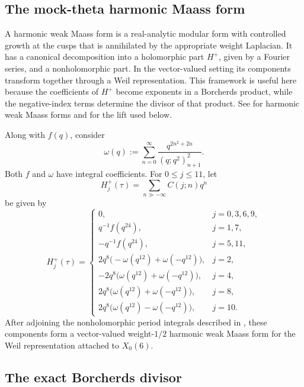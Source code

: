 \documentclass[11pt]{amsart}
\theoremstyle{remark}
\numberwithin{equation}{section}
\begin{document}
\subsection{The mock-theta harmonic Maass form}

A harmonic weak Maass form is a real-analytic modular form with controlled
growth at the cusps that is annihilated by the appropriate
weight Laplacian.  It has a canonical decomposition into a holomorphic part
$H^+$, given by a Fourier series, and a nonholomorphic part.  In the
vector-valued setting its components transform together through a Weil
representation.  This framework is useful here because the coefficients of
$H^+$ become exponents in a Borcherds product, while the negative-index
terms determine the divisor of that product.  See
\cite[Section~3]{BruinierFunke} for harmonic weak Maass forms and
\cite[Sections~6 and~8.2]{BruinierOnoAnnals} for the lift used below.

Along with $f(q)$, consider
\begin{equation}\label{eq:omega-mock}
 \omega(q):=\sum_{n=0}^{\infty}
 \frac{q^{2n^2+2n}}{(q;q^2)_{n+1}^2}.
\end{equation}
Both $f$ and $\omega$ have integral coefficients.  For $0\leq j\leq11$,
let
\[
 H_j^+(\tau)=\sum_{n\gg-\infty}C(j;n)q^n
\]
be given by
\begin{equation}\label{eq:weil}
H_j^+(\tau)=
\begin{cases}
0,&j=0,3,6,9,\\
q^{-1}f(q^{24}),&j=1,7,\\
-q^{-1}f(q^{24}),&j=5,11,\\
2q^8\bigl(-\omega(q^{12})+\omega(-q^{12})\bigr),&j=2,\\
-2q^8\bigl(\omega(q^{12})+\omega(-q^{12})\bigr),&j=4,\\
2q^8\bigl(\omega(q^{12})+\omega(-q^{12})\bigr),&j=8,\\
2q^8\bigl(\omega(q^{12})-\omega(-q^{12})\bigr),&j=10.
\end{cases}
\end{equation}
After adjoining the nonholomorphic period integrals described in
\cite[Section~8.2]{BruinierOnoAnnals}, these components form a vector-valued
weight-$1/2$ harmonic weak Maass form for the Weil representation attached to
$X_0(6)$.

\subsection{The exact Borcherds divisor}
\end{document}
